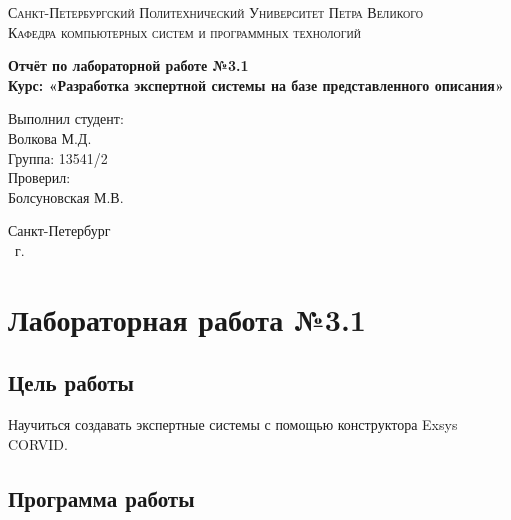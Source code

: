 \documentclass[14pt,a4paper,report]{report}
\begin{document}
\def\contentsname{Содержание}

\begin{titlepage}
	\begin{center}
		\textsc{Санкт-Петербургский Политехнический 
			Университет Петра Великого\\[5mm]
			Кафедра компьютерных систем и программных технологий}
		
		\vfill
		
		\textbf{Отчёт по лабораторной работе №3.1\\[3mm]
			Курс: «Разработка экспертной системы на базе представленного описания»\\[41mm]
		}
	\end{center}
	
	\hfill
	\begin{minipage}{.4\textwidth}
		Выполнил студент:\\[2mm] 
		Волкова М.Д.\\
		Группа: 13541/2\\[5mm]
		
		Проверил:\\[2mm] 
		Болсуновская М.В.
	\end{minipage}
	\vfill
	\begin{center}
		Санкт-Петербург\\ \the\year\ г.
	\end{center}
\end{titlepage}

\tableofcontents
\clearpage

\chapter{Лабораторная работа №3.1}

\section{Цель работы}

Научиться создавать экспертные системы с помощью конструктора Exsys CORVID.

\section{Программа работы}
\end{document}
